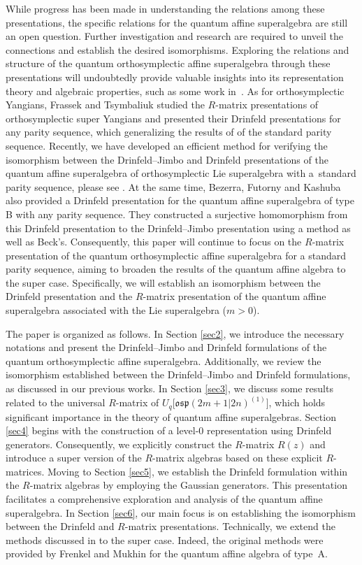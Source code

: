 \documentclass[10pt,a4paper]{amsart}
\numberwithin{equation}{section}
\begin{document}
While progress has been made in understanding the relations among these presentations, the specific relations for the quantum affine superalgebra are still an open question. Further investigation and research are required to unveil the connections and establish the desired isomorphisms. Exploring the relations and structure of the quantum orthosymplectic affine superalgebra through these presentations will undoubtedly provide valuable insights into its representation theory and algebraic properties, such as some work in~\cite{YZC2}. As for orthosymplectic Yangians, Frassek and Tsymbaliuk \cite{Frassek} studied the $R$-matrix presentations of orthosymplectic super Yangians and presented their Drinfeld presentations for any parity sequence, which
generalizing the results of \cite{AIM} of the standard parity sequence.
Recently, we have developed an efficient method for verifying the isomorphism between the Drinfeld--Jimbo and Drinfeld presentations of the quantum affine superalgebra of orthosymplectic Lie superalgebra with a~standard parity sequence, please see \cite{XWLHZ}. At the same time, Bezerra, Futorny and Kashuba \cite{Bezerra} also provided a Drinfeld presentation for the quantum affine superalgebra of type B with any parity sequence. They constructed a surjective homomorphism from this Drinfeld presentation to the Drinfeld--Jimbo presentation using a method as well as Beck's.
 Consequently, this paper will continue to focus on the $R$-matrix presentation of the quantum orthosymplectic affine superalgebra for a standard parity sequence, aiming to broaden the results of the quantum affine algebra to the super case. Specifically, we will establish an isomorphism between the Drinfeld presentation and the $R$-matrix presentation of the quantum affine superalgebra associated with the Lie superalgebra  ($m>0$).

The paper is organized as follows. In Section \ref{sec2}, we introduce the necessary notations and present the Drinfeld--Jimbo and Drinfeld formulations of the quantum orthosymplectic affine superalgebra. Additionally, we review the isomorphism established between the Drinfeld--Jimbo and Drinfeld formulations, as discussed in our previous works.
In Section \ref{sec3}, we discuss some results related to the universal $R$-matrix of $U_q\bigl[\mathfrak{osp}(2m+1|2n)^{(1)}\bigr]$, which holds significant importance in the theory of quantum affine superalgebras.
Section \ref{sec4} begins with the construction of a level-0 representation using Drinfeld generators. Consequently, we explicitly construct the $R$-matrix $R(z)$ and introduce a super version of the $R$-matrix algebras based on these explicit $R$-matrices.
Moving to Section \ref{sec5}, we establish the Drinfeld formulation within the $R$-matrix algebras by employing the Gaussian generators. This presentation facilitates a comprehensive exploration and analysis of the quantum affine superalgebra.
In Section \ref{sec6}, our main focus is on establishing the isomorphism between the Drinfeld and $R$-matrix presentations. Technically, we extend the methods discussed in \cite{JMA,JMAB} to the super case. Indeed, the original methods were provided by Frenkel and Mukhin \cite[Section 3.2]{EFEM} for the quantum affine algebra of type~A.
\end{document}
